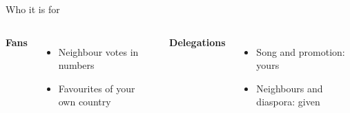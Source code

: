 \documentclass[aspectratio=43,11pt,t]{beamer}
\begin{document}
\begin{frame}{Who it is for}
  \vfill
  \begin{columns}[T,onlytextwidth]
      {\small\bfseries Fans\par}
      \vspace{0.5em}
      \begin{itemize}\footnotesize
        \item Neighbour votes in numbers
        \item Favourites of your own country
      \end{itemize}
      {\small\bfseries Delegations\par}
      \vspace{0.5em}
      \begin{itemize}\footnotesize
        \item Song and promotion: yours
        \item Neighbours and diaspora: given
      \end{itemize}
  \end{columns}
  \vfill
\end{frame}
\end{document}

